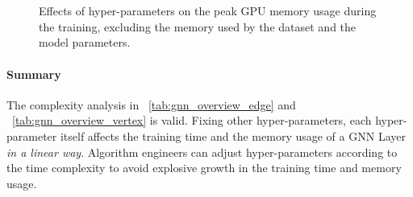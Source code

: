 \begin{figure}[H]
    \centering
    \\
    \\
    \caption{Effects of hyper-parameters on the peak GPU memory usage during the training, excluding the memory used by the dataset and the model parameters.}
    \label{fig:exp_hyperparameter_memory_usage}
\end{figure}

\paragraph{Summary}

The complexity analysis in \tablename~\ref{tab:gnn_overview_edge} and \tablename~\ref{tab:gnn_overview_vertex} is valid.
%
Fixing other hyper-parameters, each hyper-parameter itself affects the training time and the memory usage of a GNN Layer \emph{in a linear way}.
%
Algorithm engineers can adjust hyper-parameters according to the time complexity to avoid explosive growth in the training time and memory usage.

